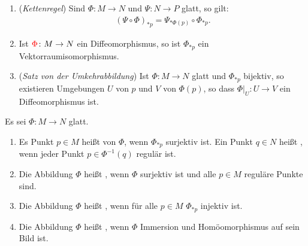 \begin{bem}\hfill
  \begin{enumerate}[label=(\roman*),widest=iii]
  \item (\emph{Kettenregel}) Sind $\Phi \colon M \to N$ und $\Psi \colon N \to P$ glatt, so gilt:
    \begin{align*}
      (\Psi \circ \Phi)_{*p} = \Psi_{*\Phi(p)} \circ \Phi_{*p}.
    \end{align*}
  \item Ist $\textcolor{red}{\Phi} \colon M \to N$ ein Diffeomorphismus, so ist $\Phi_{*p}$ ein Vektorraumisomorphismus. %
  \item (\emph{Satz von der Umkehrabbildung}) Ist $\Phi \colon M \to N$ glatt und $\Phi_{*p}$ bijektiv, so existieren Umgebungen $U$ von $p$ und $V$ von $\Phi(p)$, so dass $\Phi|_{U} \colon U \to V$ ein Diffeomorphismus ist.
  \end{enumerate}
\end{bem}

\begin{Dfn}
  Es sei $\Phi \colon M \to N$ glatt.
  \begin{enumerate}[label=(\roman*),leftmargin=*,widest=iii]
  \item Es Punkt $p \in M$ heißt  von $\Phi$, wenn $\Phi_{*p}$ surjektiv ist. Ein Punkt $q \in N$ heißt , wenn jeder Punkt $p \in \Phi^{-1}(q)$ regulär ist.
  \item Die Abbildung $\Phi$ heißt , wenn $\Phi$ surjektiv ist und alle $p \in M$ reguläre Punkte sind.
  \item Die Abbildung $\Phi$ heißt , wenn für alle $p \in M$ $\Phi_{*p}$ injektiv ist.
  \item Die Abbildung $\Phi$ heißt , wenn $\Phi$ Immersion und Homöomorphismus auf sein Bild ist.
  \end{enumerate}
\end{Dfn}

